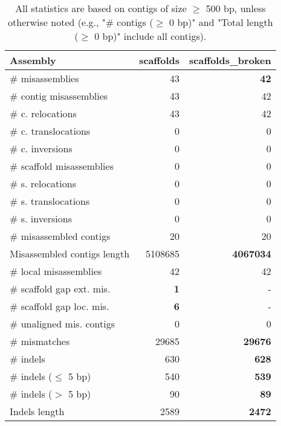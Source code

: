 \documentclass[12pt,a4paper]{article}
\begin{document}
\begin{table}[ht]
\begin{center}
\caption{All statistics are based on contigs of size $\geq$ 500 bp, unless otherwise noted (e.g., "\# contigs ($\geq$ 0 bp)" and "Total length ($\geq$ 0 bp)" include all contigs).}
\begin{tabular}{|l*{2}{|r}|}
\hline
Assembly & scaffolds & scaffolds\_broken \\ \hline
\# misassemblies & 43 & {\bf 42} \\ \hline
\hspace{2mm}\# contig misassemblies & 43 & 42 \\ \hline
\hspace{5mm}\# c. relocations & 43 & 42 \\ \hline
\hspace{5mm}\# c. translocations & 0 & 0 \\ \hline
\hspace{5mm}\# c. inversions & 0 & 0 \\ \hline
\hspace{2mm}\# scaffold misassemblies & 0 & 0 \\ \hline
\hspace{5mm}\# s. relocations & 0 & 0 \\ \hline
\hspace{5mm}\# s. translocations & 0 & 0 \\ \hline
\hspace{5mm}\# s. inversions & 0 & 0 \\ \hline
\# misassembled contigs & 20 & 20 \\ \hline
Misassembled contigs length & 5108685 & {\bf 4067034} \\ \hline
\# local misassemblies & 42 & 42 \\ \hline
\# scaffold gap ext. mis. & {\bf 1} & - \\ \hline
\# scaffold gap loc. mis. & {\bf 6} & - \\ \hline
\# unaligned mis. contigs & 0 & 0 \\ \hline
\# mismatches & 29685 & {\bf 29676} \\ \hline
\# indels & 630 & {\bf 628} \\ \hline
\hspace{5mm}\# indels ($\leq$ 5 bp) & 540 & {\bf 539} \\ \hline
\hspace{5mm}\# indels ($>$ 5 bp) & 90 & {\bf 89} \\ \hline
Indels length & 2589 & {\bf 2472} \\ \hline
\end{tabular}
\end{center}
\end{table}
\end{document}

